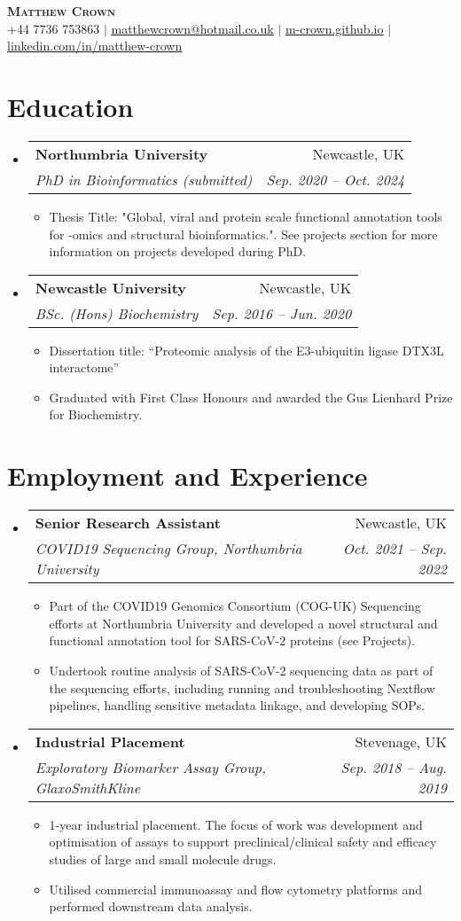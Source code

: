 \documentclass[a4paper,11pt]{article}
\makeatletter
\newcommand{\resumeItem}[1]{
  \item\small{
    {#1 \vspace{-2pt}}
  }
}
\newcommand{\resumeSubheading}[4]{
  \vspace{-2pt}\item
    \begin{tabular*}{0.97\textwidth}[t]{l@{\extracolsep{\fill}}r}
      \textbf{#1} & #2 \\
      \textit{\small#3} & \textit{\small #4} \\
    \end{tabular*}\vspace{-7pt}
}
\newcommand{\resumeSubHeadingListStart}{\begin{itemize}[leftmargin=0.15in, label={}]}
\newcommand{\resumeSubHeadingListEnd}{\end{itemize}}
\newcommand{\resumeItemListStart}{\begin{itemize}}
\newcommand{\resumeItemListEnd}{\end{itemize}\vspace{-5pt}}
\makeatother
\begin{document}

\begin{center}
    \textbf{\Huge \scshape Matthew Crown} \\ \vspace{4pt}
    \small +44 7736 753863 $|$ \href{mailto:matthewcrown@hotmail.co.uk}{\underline{matthewcrown@hotmail.co.uk}} $|$ 
    \href{https://m-crown.github.io}{\underline{m-crown.github.io}} $|$
    \href{https://linkedin.com/in/matthew-crown}{\underline{linkedin.com/in/matthew-crown}}
\end{center}


\section{Education}
  \resumeSubHeadingListStart
    \resumeSubheading
      {Northumbria University}{Newcastle, UK}
      {PhD in Bioinformatics (submitted)}{Sep. 2020 -- Oct. 2024}
      \resumeItemListStart
        \resumeItem{Thesis Title: "Global, viral and protein scale functional annotation tools for -omics and structural bioinformatics.". See projects section for more information on projects developed during PhD.}
      \resumeItemListEnd
    \resumeSubheading
      {Newcastle University}{Newcastle, UK}
      {BSc. (Hons) Biochemistry}{Sep. 2016 -- Jun. 2020}
      \resumeItemListStart
        \resumeItem{Dissertation title: “Proteomic analysis of the E3-ubiquitin ligase
        DTX3L interactome”}
        \resumeItem{Graduated with First Class Honours and awarded the Gus Lienhard Prize for Biochemistry.}
      \resumeItemListEnd
  \resumeSubHeadingListEnd


\section{Employment and Experience}
  \resumeSubHeadingListStart
    \resumeSubheading
      {Senior Research Assistant}{Newcastle, UK}
      {COVID19 Sequencing Group, Northumbria University}{Oct. 2021 -- Sep. 2022}
      \resumeItemListStart
        \resumeItem{Part of the COVID19 Genomics Consortium (COG-UK) Sequencing efforts at Northumbria University and developed a novel structural and functional annotation tool for SARS-CoV-2 proteins (see Projects).}
        \resumeItem{Undertook routine analysis of SARS-CoV-2 sequencing data as part of the sequencing efforts, including running and troubleshooting Nextflow pipelines, handling sensitive metadata linkage, and developing SOPs.}
      \resumeItemListEnd
    \resumeSubheading
      {Industrial Placement}{Stevenage, UK}
      {Exploratory Biomarker Assay Group, GlaxoSmithKline}{Sep. 2018 -- Aug. 2019}
      \resumeItemListStart
        \resumeItem{1-year industrial placement. The focus of work was development and optimisation of assays to support preclinical/clinical safety and efficacy studies of large and small molecule drugs.}
        \resumeItem{Utilised commercial immunoassay and flow cytometry platforms and performed downstream data analysis.}
      \resumeItemListEnd
  \resumeSubHeadingListEnd
\end{document}
